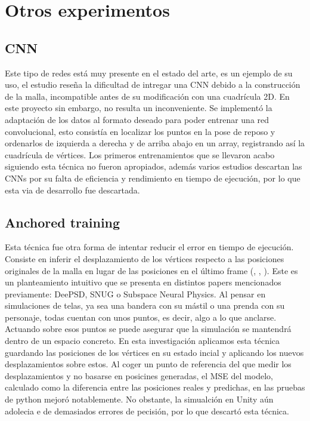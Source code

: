 \chapter*{Otros experimentos}
\label{appendix:otros}

\section*{CNN}
Este tipo de redes está muy presente en el estado del arte, \cite{chentanez_cloth_2020} es un ejemplo de su uso, el estudio reseña la dificultad de intregar una CNN debido a la construcción de la malla, incompatible antes de su modificación con una cuadrícula 2D. En este proyecto sin embargo, no resulta un inconveniente. Se implementó la adaptación de los datos al formato deseado para poder entrenar una red convolucional, esto consistía en localizar los puntos en la pose de reposo y ordenarlos de izquierda a derecha y de arriba abajo en un array, registrando así la cuadrícula de vértices. Los primeros entrenamientos que se llevaron acabo siguiendo esta técnica no fueron apropiados, además varios estudios descartan las CNNs por su falta de eficiencia y rendimiento en tiempo de ejecución, por lo que esta via de desarrollo fue descartada.


\section*{Anchored training} 
Esta técnica fue otra forma de intentar reducir el error en tiempo de ejecución. Consiste en inferir el desplazamiento de los vértices respecto a las posiciones originales de la malla en lugar de las posiciones en el último frame (\cite{bertiche_deepsd_2021}, \cite{santesteban2022snug}, \cite{holden_subspace_2019}). Este es un planteamiento intuitivo que se presenta en distintos papers mencionados previamente: DeePSD, SNUG o Subspace Neural Physics. Al pensar en simulaciones de telas, ya sea una bandera con su mástil o una prenda con su personaje, todas cuentan con unos puntos, es decir, algo a lo que anclarse. Actuando sobre esos puntos se puede asegurar que la simulación se mantendrá dentro de un espacio concreto. En esta investigación aplicamos esta técnica guardando las posiciones de los vértices en su estado incial y aplicando los nuevos desplazamientos sobre estos.
Al coger un punto de referencia del que medir los desplazamientos y no basarse en posicines generadas, el MSE del modelo, calculado como la diferencia entre las posiciones reales y predichas, en las pruebas de python mejoró notablemente. No obstante, la simualción en Unity aún adolecia e de demasiados errores de pecisión, por lo que descartó esta técnica.
        


